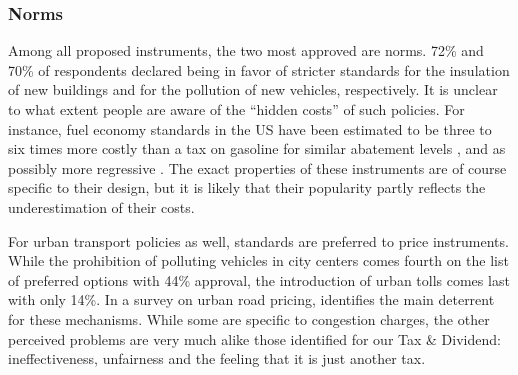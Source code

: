 \documentclass[english,5p,authoryear]{elsarticle}
\begin{document}


        \subsubsection{Norms}

Among all proposed instruments, the two most approved are norms. 72\% and 70\% of respondents declared being in favor of stricter standards for the insulation of new buildings and for the pollution of new vehicles, respectively. It is unclear to what extent people are aware of the ``hidden costs'' of such policies. For instance, fuel economy standards in the US have been estimated to be three to six times more costly than a tax on gasoline for similar abatement levels \citep{jacobsen_2013}, and as possibly more regressive \citep{jacobsen_2013, davis_knittel_2019, levinson_2019}. The exact properties of these instruments are of course specific to their design, but it is likely that their popularity partly reflects the underestimation of their costs.

For urban transport policies as well, standards are preferred to price instruments. While the prohibition of polluting vehicles in city centers comes fourth on the list of preferred options with 44\% approval, the introduction of urban tolls comes last with only 14\%. In a survey on urban road pricing, \citet{jones_1998} identifies the main deterrent for these mechanisms. While some are specific to congestion charges, the other perceived problems are very much alike those identified for our Tax \& Dividend: ineffectiveness, unfairness and the feeling that it is just another tax.
\end{document}
